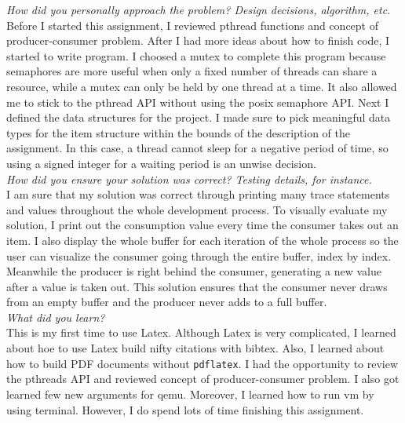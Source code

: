 \documentclass[10pt,conference,draftclsnofoot,onecolumn]{IEEEtran}
\begin{document}
\textit{How did you personally approach the problem? Design decisions, algorithm, etc.}\\

Before I started this assignment, I reviewed pthread functions and concept of producer-consumer problem. After I had more ideas about how to finish code, I started to write program. I choosed a mutex to complete this program because semaphores are more useful when only a fixed number of threads can share a resource, while a mutex can only be held by one thread at a time. It also allowed me to stick to the pthread API without using the posix semaphore API. Next I defined the data structures for the project. I made sure to pick meaningful data types for the item structure within the bounds of the description of the assignment. In this case, a thread cannot sleep for a negative period of time, so using a signed integer for a waiting period is an unwise decision. \\



\textit{How did you ensure your solution was correct? Testing details, for instance.}\\

I am sure that my solution was correct through printing many trace statements and values throughout the whole development process.   To visually evaluate my solution, I print out the consumption value every time the consumer takes out an item.  I also display the whole buffer for each iteration of the whole process so the user can visualize the consumer going through the entire buffer, index by index.  Meanwhile the producer is right behind the consumer, generating a new value after a value is taken out.  This solution ensures that the consumer never draws from an empty buffer and the producer never adds to a full buffer.\\

\textit{What did you learn?}\\

This is my first time to use Latex. Although Latex is very complicated, I learned about hoe to use Latex build nifty citations with bibtex. Also, I learned about how to build PDF documents without \texttt{pdflatex}. I had the opportunity to review the pthreads API and reviewed concept of producer-consumer problem. I also got learned few new arguments for qemu. Moreover, I learned how to run vm by using terminal. However, I do spend lots of time finishing this assignment. \\
\end{document}
